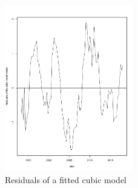 \documentclass[11pt,a4paper]{article}
\begin{document}
\begin{figure}
\centering
\includegraphics[angle=0,
width=0.5\textwidth]{resid_cubicmodel}
\caption{Residuals of a fitted cubic model
\label{fig:resid_cubicmodel}}
\end{figure}
\end{document}
